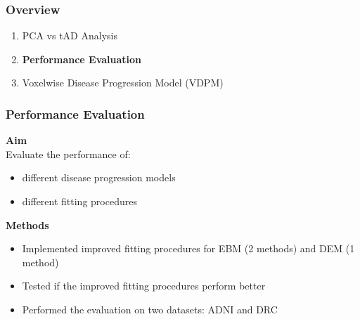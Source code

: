 \documentclass[10pt,xcolor=table]{beamer}
\begin{document}
\begin{frame}
\frametitle{Overview}

\begin{enumerate}
 \item PCA vs tAD Analysis
 \item \textbf{Performance Evaluation}
 \item Voxelwise Disease Progression Model (VDPM)
\end{enumerate}

\end{frame}

\begin{frame}
\frametitle{Performance Evaluation}

\textbf{Aim}\\
Evaluate the performance of:
\begin{itemize}
 \item different disease progression models
 \item different fitting procedures
\end{itemize}

\textbf{Methods}\\
\begin{itemize}
 \item Implemented improved fitting procedures for EBM (2 methods) and DEM (1 method)
 \item Tested if the improved fitting procedures perform better
 \item Performed the evaluation on two datasets: ADNI and DRC
\end{itemize}

\end{frame}
\end{document}
